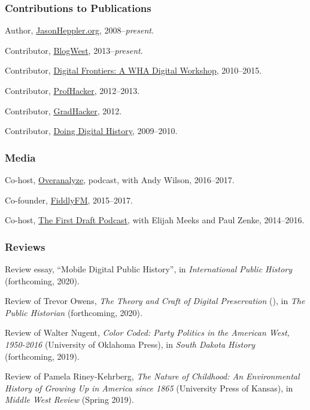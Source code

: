 \subsubsection{Contributions to
Publications}\label{contributions-to-publications}

Author, \href{http://jasonheppler.org}{JasonHeppler.org},
2008--\emph{present}.

Contributor, \href{http://blogwest.org/}{BlogWest},
2013--\emph{present}.

Contributor, \href{http://whadigitalfrontiers.com/}{Digital Frontiers: A
WHA Digital Workshop}, 2010--2015.

Contributor, \href{http://chronicle.com/blogs/profhacker/}{ProfHacker},
2012--2013.

Contributor,
\href{https://www.insidehighered.com/blogs/gradhacker}{GradHacker},
2012.

Contributor, \href{http://digitalhistory.unl.edu/}{Doing Digital
History}, 2009--2010.

\subsubsection{Media}\label{media}

Co-host, \href{http://overanalyze.fireside.fm}{Overanalyze}, podcast,
with Andy Wilson, 2016--2017.

Co-founder, \href{http://fiddly.fm}{FiddlyFM}, 2015--2017.

Co-host, \href{http://www.fiddly.fm/firstdraft/}{The First Draft
Podcast}, with Elijah Meeks and Paul Zenke, 2014--2016.

\subsubsection{Reviews}\label{reviews}

Review essay, ``Mobile Digital Public History'', in \emph{International
Public History} (forthcoming, 2020).

Review of Trevor Owens, \emph{The Theory and Craft of Digital
Preservation} (), in \emph{The Public Historian} (forthcoming, 2020).

Review of Walter Nugent, \emph{Color Coded: Party Politics in the
American West, 1950-2016} (University of Oklahoma Press), in \emph{South
Dakota History} (forthcoming, 2019).

Review of Pamela Riney-Kehrberg, \emph{The Nature of Childhood: An
Environmental History of Growing Up in America since 1865} (University
Press of Kansas), in \emph{Middle West Review} (Spring 2019).


